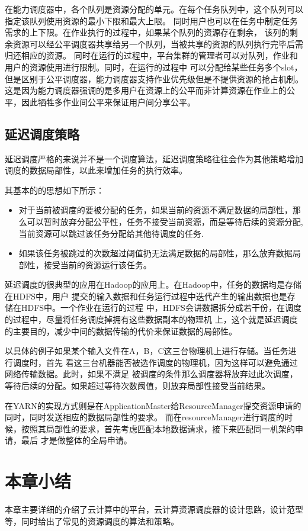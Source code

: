 在能力调度器中，各个队列是资源分配的单元。在每个任务队列中，这个队列可以指定该队列使用资源的最小下限和最大上限。
同时用户也可以在任务中制定任务需求的上下限。在作业执行的过程中，如果某个队列的资源存在剩余，
该列的剩余资源可以经公平调度器共享给另一个队列，当被共享的资源的队列执行完毕后需归还相应的资源。
同时在运行的过程中，平台集群的管理者可以对队列，作业和用户的资源使用进行限制。同时，在运行的过程中
可以分配给某些任务多个slot，但是区别于公平调度器，能力调度器支持作业优先级但是不提供资源的抢占机制。
这是因为能力调度器强调的是多用户在资源上的公平而非计算资源在作业上的公平，因此牺牲多作业间公平来保证用户间分享公平。
\subsection{延迟调度策略}
延迟调度严格的来说并不是一个调度算法，延迟调度策略往往会作为其他策略增加调度的数据局部性，以此来增加任务的执行效率。

其基本的的思想如下所示：
\begin{itemize}
\item 对于当前被调度的要被分配的任务，如果当前的资源不满足数据的局部性，那么可以暂时放弃分配公平性，任务不接受当前资源，而是等待后续的资源分配,
当前资源可以跳过该任务分配给其他待调度的任务.
\item 如果该任务被跳过的次数超过阈值扔无法满足数据的局部性，那么放弃数据局部性，接受当前的资源运行该任务。
\end{itemize}
延迟调度的很典型的应用在Hadoop的应用上。在Hadoop中，任务的数据均是存储在HDFS中，用户
提交的输入数据和任务运行过程中迭代产生的输出数据也是存储在HDFS中。一个作业在运行的过程
中，HDFS会讲数据拆分成若干份，在调度的过程中，尽量将任务调度掉拥有这些数据副本的物理机
上，这个就是延迟调度的主要目的，减少中间的数据传输的代价来保证数据的局部性。

以具体的例子如果某个输入文件在A，B，C这三台物理机上进行存储。当任务进行调度时，首先
看这三台机器能否被选作调度的物理机，因为这样可以避免通过网络传输数据。此时，如果不满足
被调度的条件那么调度器将放弃过此次调度，等待后续的分配。如果超过等待次数阈值，则放弃局部性接受当前结果。

在YARN的实现方式则是在ApplicationMaster给ResourceManager提交资源申请的同时，同时发送相应的数据局部性的要求。
而在resourceManager进行调度的时候，按照其局部性的要求，首先考虑匹配本地数据请求，接下来匹配同一机架的申请，最后
才是做整体的全局申请。

\section{本章小结}
本章主要详细的介绍了云计算中的平台，云计算资源调度器的设计思路，设计范型等，同时给出了常见的资源调度的算法和策略。
